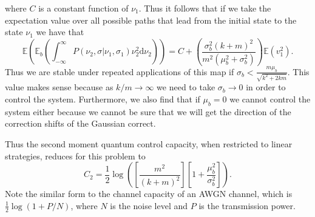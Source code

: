 \documentclass[superscriptaddress,aps,pra,nofootinbib,onecolumn,notitlepage,10pt]{revtex4-1}
\begin{document}
where $C$ is a constant function of $\nu_1$.
Thus it follows that if we take the expectation value over all possible paths that lead from the initial state to the state $\nu_1$ we have that
\begin{equation}
\mathbb{E} \left(\mathbb{E}_{b}\left(\int_{-\infty}^\infty P(\nu_2,\sigma|\nu_1,\sigma_1) \nu_2^2\mathrm{d}\nu_2\right)\right) = C + \left(\frac{\sigma_b^2(k+m)^2}{m^2(\mu_b^2+\sigma_b^2)}\right)\mathbb{E}(v_1^2).
\end{equation}
Thus we are stable under repeated applications of this map if $\sigma_b < \frac{m\mu_b}{\sqrt{k^2 +2km}}$.  This value makes sense because as $k/m\rightarrow \infty$ we need to take $\sigma_b \rightarrow 0$ in order to control the system.  Furthermore, we also find that if $\mu_b=0$ we cannot control the system either because we cannot be sure that we will get the direction of the correction shifts of the Gaussian correct.

Thus the second moment quantum control capacity, when restricted to linear strategies, reduces for this problem to
\begin{equation}
C_2 = \frac{1}{2}\log \left(\left[\frac{m^2}{(k+m)^2}\right]\left[1+\frac{\mu_b^2}{\sigma_b^2} \right]\right).
\end{equation}
Note the similar form to the channel capacity of an AWGN channel, which is $\frac{1}{2} \log(1+P/N)$, where $N$ is the noise level and $P$ is the transmission power.
\end{document}
